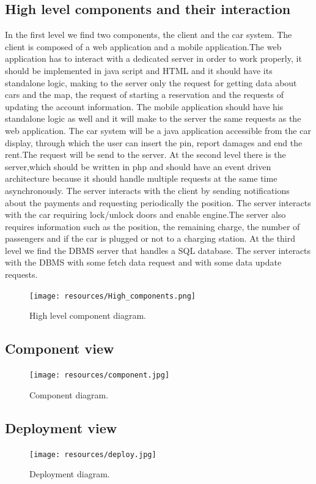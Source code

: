 \subsection{High level components and their interaction}
In the first level we find two components, the client and the car system. The client is composed of a web application and a mobile application.The web application has to interact with a dedicated server in order to work properly, it should be implemented in java script and HTML and it should have its standalone logic, making to the server only the request for getting data about cars and the map, the request of starting a reservation and the requests of updating the account information. The mobile application should have his standalone logic as well and it will make to the server the same requests as the web application. The car system will be a java application accessible from the car display, through which the user can insert the pin, report damages and end the rent.The request will be send to the server. 
At the second level there is the server,which should be written in php and should have an event driven architecture because it should handle multiple requests at the same time asynchronously. The server interacts with the client by sending notifications about the payments and requesting periodically the position. The server interacts with the car requiring lock/unlock doors and enable engine.The server also requires information such as the position, the remaining charge, the number of passengers and if the car is plugged or not to a charging station.  
At the third level we find the DBMS server that handles a SQL database.
The server interacts with the DBMS with some fetch data request and with some data update requests.
\\

\begin{figure}[hp]
\centering
\texttt{[image: resources/High\_components.png]}
\caption{\label{fig:high_component}High level component diagram.}
\end{figure}


\newpage
\subsection{Component view}
\begin{figure}[hp]
\centering
\texttt{[image: resources/component.jpg]}
\caption{\label{fig:component}Component diagram.}
\end{figure}

\newpage
\subsection{Deployment view}
\begin{figure}[hp]
\centering
\texttt{[image: resources/deploy.jpg]}
\caption{\label{fig:deploy}Deployment diagram.}
\end{figure}

